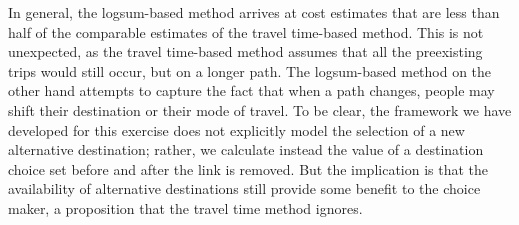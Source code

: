 \documentclass[]{ascelike-new}
\begin{document}
In general, the logsum-based method arrives at cost estimates that are
less than half of the comparable estimates of the travel time-based
method. This is not unexpected, as the travel time-based method assumes
that all the preexisting trips would still occur, but on a longer path.
The logsum-based method on the other hand attempts to capture the fact
that when a path changes, people may shift their destination or their
mode of travel. To be clear, the framework we have developed for this
exercise does not explicitly model the selection of a new alternative
destination; rather, we calculate instead the value of a destination
choice set before and after the link is removed. But the implication is
that the availability of alternative destinations still provide some
benefit to the choice maker, a proposition that the travel time method
ignores.
\end{document}
